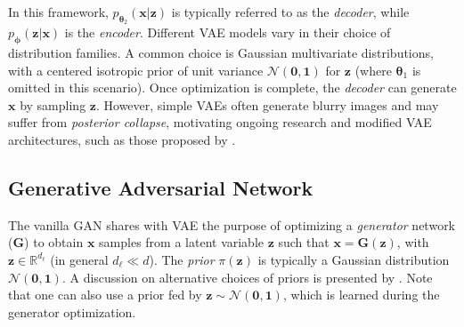 \documentclass[fleqn,usenatbib]{mnras}
\begin{document}
In this framework, $p_{\bm{\theta}_2}(\bm{x}|\bm{z})$ is typically referred to as the \textit{decoder}, while $p_{\bm{\phi}}(\bm{z}|\bm{x})$ is the \textit{encoder}. Different VAE models vary in their choice of distribution families. A common choice is Gaussian multivariate distributions, with a centered isotropic prior of unit variance $\mathcal{N}(\bm{0}, \bm{1})$ for $\bm{z}$ (where $\bm{\theta}_1$ is omitted in this scenario). Once optimization is complete, the \textit{decoder} can generate $\bm{x}$ by sampling $\bm{z}$. However, simple VAEs often generate blurry images and may suffer from \textit{posterior collapse}, motivating ongoing research \citep[e.g.,][]{engel2018latent, Takida2022} and modified VAE architectures, such as those proposed by \cite{Lanusse2021}.

\subsection{Generative Adversarial Network}
\label{sec-GAN}
%
The vanilla GAN \citep{goodfellow2014generative} shares with VAE the purpose of optimizing a \textit{generator} network ($\bm{G}$) to obtain $\bm{x}$ samples from a latent variable $\bm{z}$ such that $\bm{x} = \bm{G}(\bm{z})$, with $\bm{z}\in\mathbb{R}^{d_\ell}$ (in general $d_\ell\ll d$). The \textit{prior} $\pi(\bm{z})$ is typically a Gaussian distribution $\mathcal{N}(\bm{0},\bm{1})$. A discussion on alternative choices of priors is presented by \cite{Brock2019}. Note that one can also use a prior fed by $\bm{z}\sim \mathcal{N}(\bm{0},\bm{1})$, which is learned during the generator optimization.
\end{document}
